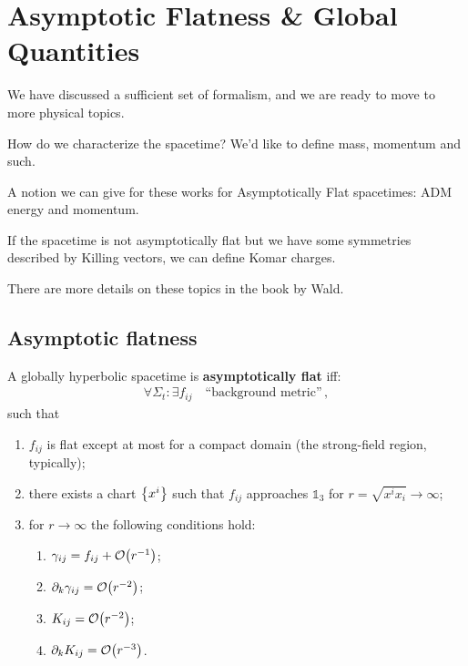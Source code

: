 \documentclass[main.tex]{subfiles}
\begin{document}
\section{Asymptotic Flatness \& Global Quantities}


We have discussed a sufficient set of formalism, and we are ready to move to more physical topics. 

How do we characterize the spacetime? We'd like to define mass, momentum and such. 

A notion we can give for these works for Asymptotically Flat spacetimes: ADM energy and momentum. 

If the spacetime is not asymptotically flat but we have some symmetries described by Killing vectors, we can define Komar charges. 

There are more details on these topics in the book by Wald. 

\subsection{Asymptotic flatness}

\begin{definition}
A globally hyperbolic spacetime is \textbf{asymptotically flat} iff: 
%
\begin{align}
\forall \Sigma_t \colon \exists f_{ij} \quad \text{``background metric''}
\,,
\end{align}
%
such that 
\begin{enumerate}
    \item \(f_{ij}\) is flat except at most for a compact domain (the strong-field region, typically); 
    \item there exists a chart \(\qty{x^{i}}\) such that \(f_{ij}\) approaches \(\mathbb{1}_3\) for \(r = \sqrt{x^{i} x_i} \to \infty \);
    \item for \(r \to \infty \) the following conditions hold:
    \begin{enumerate}
        \item \(\gamma_{ij} = f_{ij} + \order{r^{-1}}\);\label{item:first-condition-af}
        \item \(\partial_{k} \gamma_{ij} = \order{r^{-2}}\);\label{item:second-condition-af}
        \item \(K_{ij} = \order{r^{-2}}\);
        \item \(\partial_{k} K_{ij} = \order{r^{-3}}\).
    \end{enumerate}
\end{enumerate}
\end{definition}
\end{document}

